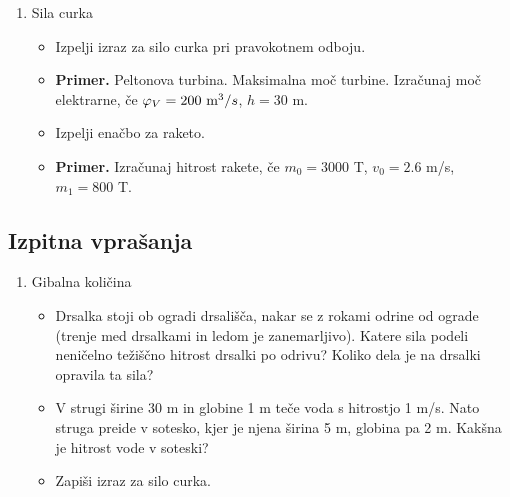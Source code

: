 \begin{enumerate}
    \item Sila curka
    \begin{itemize}
        \item Izpelji izraz za silo curka pri pravokotnem odboju.
        \item \textbf{Primer.} Peltonova turbina. Maksimalna moč turbine. Izračunaj moč elektrarne, če \(\oldphi_V = 200 \ \text{m}^3/s\), \(h = 30\) m. 
        \item Izpelji enačbo za raketo.
        \item \textbf{Primer.} Izračunaj hitrost rakete, če \(m_0 = 3000\) T, \(v_0 = 2.6\) m/s, \(m_1 = 800\) T.
    \end{itemize}
\end{enumerate}

\newpage
\subsection*{Izpitna vprašanja}
\begin{enumerate}
    \item Gibalna količina
    \begin{itemize}
        \item Drsalka stoji ob ogradi drsališča, nakar se z rokami odrine od ograde (trenje med drsalkami in ledom je zanemarljivo). Katere sila podeli neničelno težiščno hitrost drsalki po odrivu? Koliko dela je na drsalki opravila ta sila?
        \item V strugi širine 30 m in globine 1 m teče voda s hitrostjo 1 m/s. Nato struga preide v sotesko, kjer je njena širina 5 m, globina pa 2 m. Kakšna je hitrost vode v soteski?
        \item Zapiši izraz za silo curka.
    \end{itemize}
\end{enumerate}